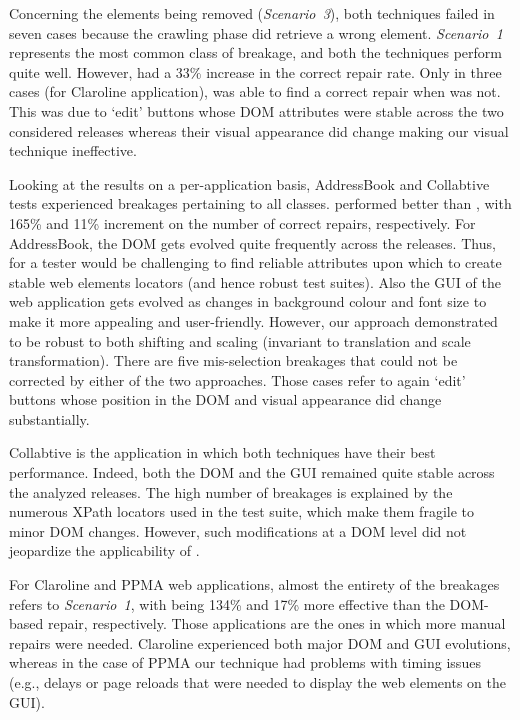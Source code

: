 Concerning the elements being removed (\textit{Scenario~3}), both techniques failed in seven cases because the crawling phase did retrieve a wrong element. 
\textit{Scenario~1} represents the most common class of breakage, and both the techniques perform quite well. However, \tool had a $33\%$ increase in the correct repair rate. Only in three cases (for Claroline application), \water was able to find a correct repair when \tool was not. This was due to `edit' buttons whose DOM attributes were stable across the two considered releases whereas their visual appearance did change making our visual technique ineffective.

Looking at the results on a per-application basis, AddressBook and Collabtive tests experienced breakages pertaining to all classes. 
\tool performed better than \water, with 165\% and 11\% increment on the number of correct repairs, respectively. 
For AddressBook, the DOM gets evolved quite frequently across the releases. Thus, for a tester would be challenging to find reliable attributes upon which to create stable web elements locators  (and hence robust test suites). Also the GUI of the web application gets evolved as changes in background colour and font size to make it more appealing and user-friendly. However, our approach demonstrated to be robust to both shifting and scaling (invariant to translation and scale transformation). 
%
There are five mis-selection breakages that could not be corrected by either of the two approaches. Those cases refer to again `edit' buttons whose position in the DOM and visual appearance did change substantially. 

Collabtive is the application in which both techniques have their best performance. Indeed, both the DOM and the GUI remained quite stable across the analyzed releases. The high number of breakages is explained by the numerous XPath locators used in the test suite, which make them fragile to minor DOM changes. However, such modifications at a DOM level did not jeopardize the applicability of \water.

For Claroline and PPMA web applications, almost the entirety of the breakages refers to \textit{Scenario~1}, with \tool being 134\% and 17\% more effective than the DOM-based repair, respectively. Those applications are the ones in which more manual repairs were needed. Claroline experienced both major DOM and GUI evolutions, whereas in the case of PPMA our technique had problems with timing issues (e.g., delays or page reloads that were needed to display the web elements on the GUI).

